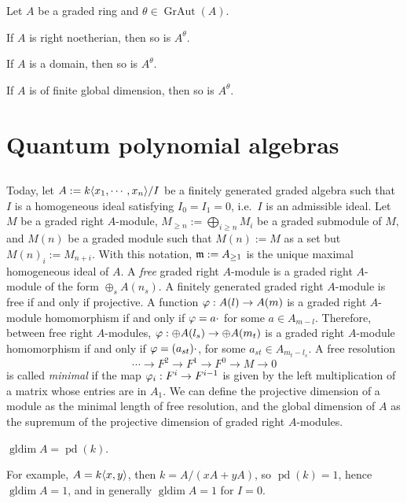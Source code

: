 \documentclass{../../../small}
\newcommand{\GrAut}{\operatorname{GrAut}}
\newcommand{\gldim}{\operatorname{gldim}}
\renewcommand{\pd}{\operatorname{pd}}
\begin{document}
\begin{thm}
Let $A$ be a graded ring and $\theta\in\GrAut(A)$.
\begin{parts}
\item If $A$ is right noetherian, then so is $A^\theta$.
\item If $A$ is a domain, then so is $A^\theta$.
\item If $A$ is of finite global dimension, then so is $A^\theta$.
\end{parts}
\end{thm}





\newpage
\section{Quantum polynomial algebras}

\subsection{}

Today, let $A:=k\langle x_1,\cdots,x_n\rangle/I$ be a finitely generated graded algebra such that $I$ is a homogeneous ideal satisfying $I_0=I_1=0$, i.e.~$I$ is an admissible ideal.
Let $M$ be a graded right $A$-module, $M_{\ge n}:=\bigoplus_{i\ge n}M_i$ be a graded submodule of $M$, and $M(n)$ be a graded module such that $M(n):=M$ as a set but $M(n)_i:=M_{n+i}$.
With this notation, $\mathfrak{m}:=A_{\ge1}$ is the unique maximal homogeneous ideal of $A$.
A \emph{free} graded right $A$-module is a graded right $A$-module of the form $\oplus_s A(n_s)$.
A finitely generated graded right $A$-module is free if and only if projective. 
A function $\varphi:A(l)\to A(m)$ is a graded right $A$-module homomorphism if and only if $\varphi=a\cdot$ for some $a\in A_{m-l}$.
Therefore, between free right $A$-modules, $\varphi:\oplus A(l_s)\to\oplus A(m_t)$ is a graded right $A$-module homomorphism if and only if $\varphi=(a_{st})\cdot$, for some $a_{st}\in A_{m_t-l_s}$.
A free resolution
\[\cdots\to F^2\to F^1\to F^0\to M\to0\]
is called \emph{minimal} if the map $\varphi_i:F^i\to F^{i-1}$ is given by the left multiplication of a matrix whose entries are in $A_1$.
We can define the projective dimension of a module as the minimal length of free resolution, and the global dimension of $A$ as the supremum of the projective dimension of graded right $A$-modules.
\begin{lem}$\gldim A=\pd(k)$.\end{lem}
For example, $A=k\langle x,y\rangle$, then $k=A/(xA+yA)$, so $\pd(k)=1$, hence $\gldim A=1$, and in generally $\gldim A=1$ for $I=0$.
\end{document}
